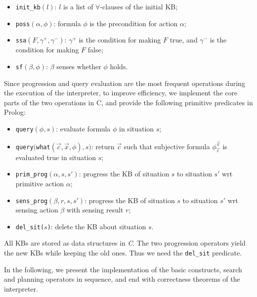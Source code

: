 \documentclass[letterpaper]{article}
\begin{document}
\begin{itemize}
\item \texttt{init\_kb}$(l)$: $l$ is a list of $\forall$-clauses of the initial KB;

\item \texttt{poss}$(\alpha,\phi)$: formula $\phi$ is the precondition for action $\alpha$;

\item \texttt{ssa}$(F,\gamma^+,\gamma^-)$: $\gamma^+$ is the condition for making $F$ true, and $\gamma^-$ is the condition for making $F$ false;

\item \texttt{sf}$(\beta,\phi)$: $\beta$ senses whether $\phi$ holds.
\end{itemize}


Since progression and query evaluation are the most frequent operations during the execution of the interpreter, to improve efficiency, we implement the core parts of the two operations in C, and provide the following primitive predicates in Prolog:

\begin{itemize}

\item \texttt{query}$(\phi,s)$: evaluate  formula $\phi$ in situation $s$;

\item \texttt{query}$($\texttt{what}$(\vec{c}, \vec{x}, \phi), s)$: return $\vec{c}$ such that subjective formula $\phi_{\vec{c}}^{\vec{x}}$ is evaluated true in situation $s$;

\item \texttt{prim\_prog}$(\alpha,s,s')$: progress the KB of situation $s$ to situation $s'$ wrt primitive action $\alpha$;

\item \texttt{sens\_prog}$(\beta,r,s,s')$: progress the KB of situation $s$ to situation $s'$ wrt sensing action $\beta$ with sensing result $r$;

\item \texttt{del\_sit($s$)}: delete the KB about situation $s$.

\end{itemize}
All KBs are stored as data structures in \emph{C}. The two progression operators yield the new KBs while keeping the old ones. Thus we need the \texttt{del\_sit} predicate.

In the following, we present the implementation of the basic constructs, search and planning operators in sequence,
and end with correctness theorems of the interpreter.
\end{document}
